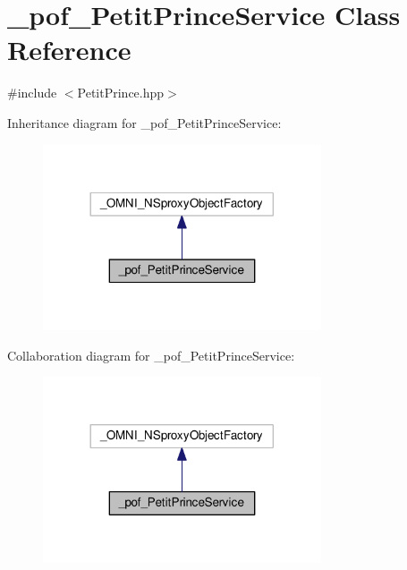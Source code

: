 \hypertarget{class__pof___petit_prince_service}{}\section{\+\_\+pof\+\_\+\+Petit\+Prince\+Service Class Reference}
\label{class__pof___petit_prince_service}


{\ttfamily \#include $<$Petit\+Prince.\+hpp$>$}



Inheritance diagram for \+\_\+pof\+\_\+\+Petit\+Prince\+Service\+:
\nopagebreak
\begin{figure}[H]
\begin{center}
\leavevmode
\includegraphics[width=233pt]{class__pof___petit_prince_service__inherit__graph}
\end{center}
\end{figure}


Collaboration diagram for \+\_\+pof\+\_\+\+Petit\+Prince\+Service\+:
\nopagebreak
\begin{figure}[H]
\begin{center}
\leavevmode
\includegraphics[width=233pt]{class__pof___petit_prince_service__coll__graph}
\end{center}
\end{figure}
